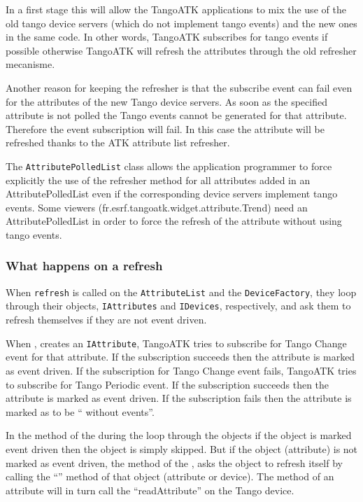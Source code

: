 In a first stage this will allow the TangoATK applications to mix
the use of the old tango device servers (which do not implement tango
events) and the new ones in the same code. In other words, TangoATK
subscribes for tango events if possible otherwise TangoATK will refresh
the attributes through the old refresher mecanisme.

Another reason for keeping the refresher is that the subscribe event
can fail even for the attributes of the new Tango device servers.
As soon as the specified attribute is not polled the Tango events
cannot be generated for that attribute. Therefore the event subscription
will fail. In this case the attribute will be refreshed thanks to
the ATK attribute list refresher.

The \texttt{AttributePolledList} class allows the application programmer
to force explicitly the use of the refresher method for all attributes
added in an AttributePolledList even if the corresponding device servers
implement tango events. Some viewers (fr.esrf.tangoatk.widget.attribute.Trend)
need an AttributePolledList in order to force the refresh of the attribute
without using tango events.

\subsubsection{What happens on a refresh}

When \texttt{refresh} is called on the \texttt{AttributeList}
and the \texttt{DeviceFactory}, they loop through their objects, \texttt{IAttributes}
and \texttt{IDevices}, respectively, and ask them to refresh themselves
if they are not event driven.

When , creates an \texttt{IAttribute}, TangoATK
tries to subscribe for Tango Change event for that attribute. If the
subscription succeeds then the attribute is marked as event driven.
If the subscription for Tango Change event fails, TangoATK tries to
subscribe for Tango Periodic event. If the subscription succeeds then
the attribute is marked as event driven. If the subscription fails
then the attribute is marked as to be `` without events''.

In the  method of the  during
the loop through the objects if the object is marked event driven
then the object is simply skipped. But if the object (attribute) is
not marked as event driven, the  method of the ,
asks the object to refresh itself by calling the ``''
method of that object (attribute or device). The 
method of an attribute will in turn call the ``readAttribute'' on
the Tango device.

